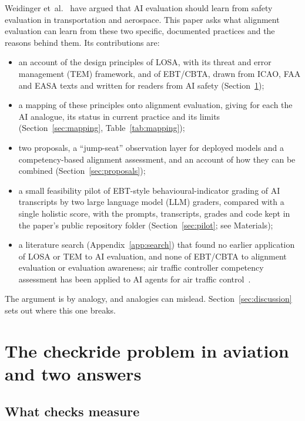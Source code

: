 \documentclass[11pt]{article}
\begin{document}
Weidinger et~al.~\cite{weidinger2025} have argued that AI evaluation should learn from safety evaluation in transportation and aerospace. This paper asks what alignment evaluation can learn from these two specific, documented practices and the reasons behind them. Its contributions are:
\begin{itemize}
  \item an account of the design principles of LOSA, with its threat and error management (TEM) framework, and of EBT/CBTA, drawn from ICAO, FAA and EASA texts and written for readers from AI safety (Section~\ref{sec:aviation});
  \item a mapping of these principles onto alignment evaluation, giving for each the AI analogue, its status in current practice and its limits (Section~\ref{sec:mapping}, Table~\ref{tab:mapping});
  \item two proposals, a ``jump-seat'' observation layer for deployed models and a competency-based alignment assessment, and an account of how they can be combined (Section~\ref{sec:proposals});
  \item a small feasibility pilot of EBT-style behavioural-indicator grading of AI transcripts by two large language model (LLM) graders, compared with a single holistic score, with the prompts, transcripts, grades and code kept in the paper's public repository folder (Section~\ref{sec:pilot}; see Materials);
  \item a literature search (Appendix~\ref{app:search}) that found no earlier application of LOSA or TEM to AI evaluation, and none of EBT/CBTA to alignment evaluation or evaluation awareness; air traffic controller competency assessment has been applied to AI agents for air traffic control~\cite{carvell2026,pepper2026}.
\end{itemize}

The argument is by analogy, and analogies can mislead. Section~\ref{sec:discussion} sets out where this one breaks.

\section{The checkride problem in aviation and two answers}\label{sec:aviation}

\subsection{What checks measure}\label{sec:checks}
\end{document}
